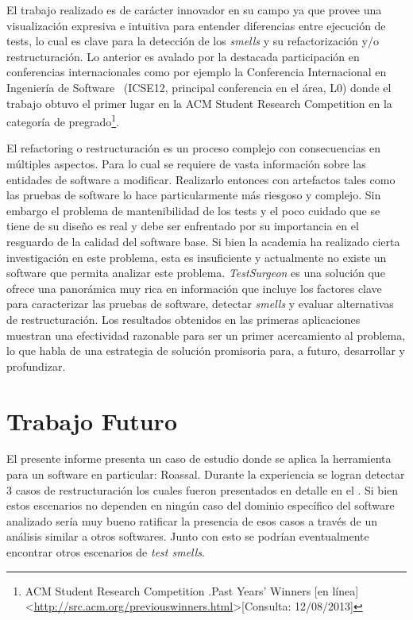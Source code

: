 \par El trabajo realizado es de carácter innovador en su campo ya que provee una visualización expresiva e intuitiva para entender diferencias entre ejecución de tests, lo cual es clave para la detección de los \emph{smells} y su refactorización y/o restructuración. Lo anterior es avalado por la destacada participación en conferencias internacionales como por ejemplo la Conferencia Internacional en Ingeniería de Software~\cite{Este12a} (ICSE12, principal conferencia en el área, L0) donde el trabajo obtuvo el primer lugar en la ACM Student Research Competition  en la categoría de pregrado\footnote{ACM Student Research Competition .Past Years' Winners [en línea] \textless\url{http://src.acm.org/previouswinners.html}\textgreater [Consulta: 12/08/2013]}. 


\par El refactoring o restructuración es un proceso complejo con consecuencias en múltiples aspectos. Para lo cual se requiere de vasta información sobre las entidades de software a modificar. Realizarlo entonces con artefactos tales como las pruebas de software lo hace particularmente más riesgoso y complejo. Sin embargo el problema de mantenibilidad de los tests y el poco cuidado que se tiene de su diseño es real y debe ser enfrentado por su importancia en el resguardo de la calidad del software base. Si bien la academia ha realizado cierta investigación en este problema, esta es insuficiente y actualmente no existe un software que permita analizar este problema. \emph{TestSurgeon} es una solución que ofrece una panorámica muy rica en información que incluye los factores clave para caracterizar las pruebas de software, detectar \emph{smells} y evaluar alternativas de restructuración. Los resultados obtenidos en las primeras aplicaciones muestran una efectividad razonable para ser un primer acercamiento al problema, lo que habla de una estrategia de solución promisoria para, a futuro, desarrollar y profundizar. 



\section{Trabajo Futuro}

\par El presente informe presenta un caso de estudio donde se aplica la herramienta para un software en particular: Roassal. Durante la experiencia se logran detectar 3 casos de restructuración los cuales fueron presentados en detalle en el . Si bien estos escenarios no dependen en ningún caso del dominio específico del software analizado sería muy bueno ratificar la presencia de esos casos a través de un análisis similar a otros softwares. Junto con esto se podrían eventualmente encontrar otros escenarios de \emph{test smells}.


